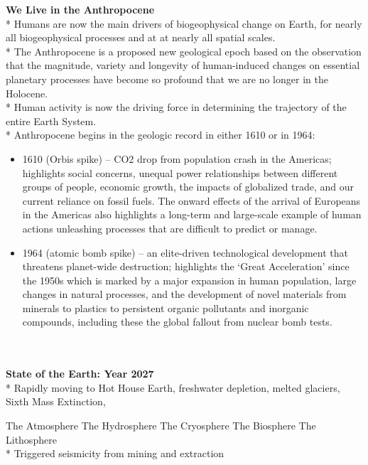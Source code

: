\documentclass[12pt, letterpaper]{article}
\begin{document}
\normalsize
\begin{outline}[enumerate]
\1 \textbf{We Live in the Anthropocene}\\
* Humans are now the main drivers of biogeophysical change on Earth, for nearly all biogeophysical processes and at at nearly all spatial scales.\\

* The Anthropocene is a proposed new geological epoch based on the observation that the magnitude, variety and longevity of human-induced changes on essential planetary processes have become so profound that we are no longer in the Holocene.\\

* Human activity is now the driving force in determining the trajectory of the entire Earth System.\\

* Anthropocene begins in the geologic record in either 1610 or in 1964:
\begin{itemize}
  \item 1610 (Orbis spike) -- CO2 drop from population crash in the Americas; highlights social concerns, unequal power relationships between different groups of people, economic growth, the impacts of globalized trade, and our current reliance on fossil fuels. The onward effects of the arrival of Europeans in the Americas also highlights a long-term and large-scale example of human actions unleashing processes that are difficult to predict or manage.
  \item 1964 (atomic bomb spike) -- an elite-driven technological development that threatens planet-wide destruction; highlights the ‘Great Acceleration’ since the 1950s which is marked by a major expansion in human population, large changes in natural processes, and the development of novel materials from minerals to plastics to persistent organic pollutants and inorganic compounds, including these the global fallout from nuclear bomb tests.
\end{itemize}

\textit{\cite{steffen_2018_trajectories}}\\
\textit{\cite{lewis_2015_defining}}\\



\1 \textbf{State of the Earth: Year 2027}\\
* Rapidly moving to Hot House Earth, freshwater depletion, melted glaciers, Sixth Mass Extinction,

\2 The Atmosphere 
\2 The Hydrosphere 
\2 The Cryosphere
\2 The Biosphere
\2 The Lithosphere\\
* Triggered seismicity from mining and extraction\\


\end{outline}
\end{document}
